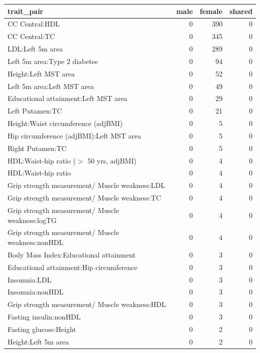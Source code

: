 \begin{table}[ht]
\centering
\begin{tabular}{lrrr}
  \hline
trait\_pair & male & female & shared \\ 
  \hline
CC Central:HDL &   0 & 390 &   0 \\ 
  CC Central:TC &   0 & 345 &   0 \\ 
  LDL:Left 5m area &   0 & 289 &   0 \\ 
  Left 5m area:Type 2 diabetes &   0 &  94 &   0 \\ 
  Height:Left MST area &   0 &  52 &   0 \\ 
  Left 5m area:Left MST area &   0 &  49 &   0 \\ 
  Educational attainment:Left MST area &   0 &  29 &   0 \\ 
  Left Putamen:TC &   0 &  21 &   0 \\ 
  Height:Waist circumference (adjBMI) &   0 &   5 &   0 \\ 
  Hip circumference (adjBMI):Left MST area &   0 &   5 &   0 \\ 
  Right Putamen:TC &   0 &   5 &   0 \\ 
  HDL:Waist-hip ratio ($>$ 50 yrs, adjBMI) &   0 &   4 &   0 \\ 
  HDL:Waist-hip ratio &   0 &   4 &   0 \\ 
  Grip strength measurement/ Muscle weakness:LDL &   0 &   4 &   0 \\ 
  Grip strength measurement/ Muscle weakness:TC &   0 &   4 &   0 \\ 
  Grip strength measurement/ Muscle weakness:logTG &   0 &   4 &   0 \\ 
  Grip strength measurement/ Muscle weakness:nonHDL &   0 &   4 &   0 \\ 
  Body Mass Index:Educational attainment &   0 &   3 &   0 \\ 
  Educational attainment:Hip circumference &   0 &   3 &   0 \\ 
  Insomnia:LDL &   0 &   3 &   0 \\ 
  Insomnia:nonHDL &   0 &   3 &   0 \\ 
  Grip strength measurement/ Muscle weakness:HDL &   0 &   3 &   0 \\ 
  Fasting insulin:nonHDL &   0 &   3 &   0 \\ 
  Fasting glucose:Height &   0 &   2 &   0 \\ 
  Height:Left 5m area &   0 &   2 &   0 \\ 

\end{tabular}
\end{table}
